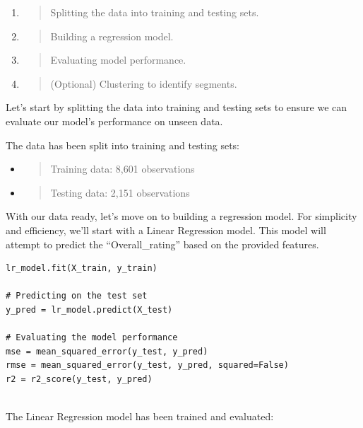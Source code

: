\documentclass[
]{article}
\begin{document}
\begin{enumerate}
\def\labelenumi{\arabic{enumi}.}
\item
  \begin{quote}
  Splitting the data into training and testing sets.
  \end{quote}
\item
  \begin{quote}
  Building a regression model.
  \end{quote}
\item
  \begin{quote}
  Evaluating model performance.
  \end{quote}
\item
  \begin{quote}
  (Optional) Clustering to identify segments.
  \end{quote}
\end{enumerate}

Let's start by splitting the data into training and testing sets to
ensure we can evaluate our model's performance on unseen data.

The data has been split into training and testing sets:

\begin{itemize}
\item
  \begin{quote}
  Training data: 8,601 observations
  \end{quote}
\item
  \begin{quote}
  Testing data: 2,151 observations
  \end{quote}
\end{itemize}

With our data ready, let's move on to building a regression model. For
simplicity and efficiency, we'll start with a Linear Regression model.
This model will attempt to predict the ``Overall\_rating'' based on the
provided features.

\begin{verbatim}
lr_model.fit(X_train, y_train)

# Predicting on the test set
y_pred = lr_model.predict(X_test)

# Evaluating the model performance
mse = mean_squared_error(y_test, y_pred)
rmse = mean_squared_error(y_test, y_pred, squared=False)
r2 = r2_score(y_test, y_pred)
 
\end{verbatim}

The Linear Regression model has been trained and evaluated:
\end{document}
